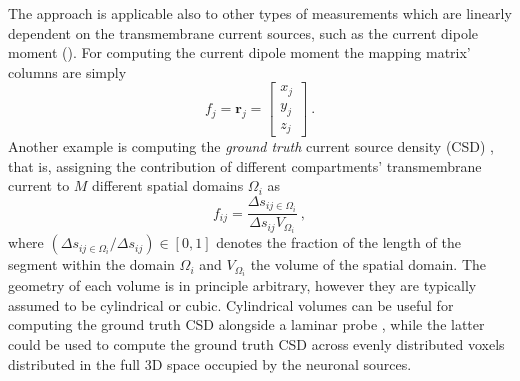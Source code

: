 The approach is applicable also to other types of measurements which are linearly dependent on the transmembrane current sources,
such as the current dipole moment ().
For computing the current dipole moment the mapping matrix' columns are simply
%
\begin{equation}
f_{j} = \mathbf{r}_j
=
\begin{bmatrix}
x_j \\
y_j \\
z_j
\end{bmatrix} ~.
\end{equation}
%
Another example is computing the \textit{ground truth} current source density (CSD) \cite{Pettersen2008,Hagen2016,Hagen2017},
that is, assigning the contribution of different compartments' transmembrane current to $M$ different spatial domains $\Omega_i$ as
%
\begin{equation}
f_{ij} = \frac{\Delta s_{ij\in \Omega_i}}{\Delta s_{ij} V_{\Omega_i}} ~,
\label{eq:LFPy:gtCSD}
\end{equation}
%
where $(\Delta s_{ij\in \Omega_i} / \Delta s_{ij}) \in [0, 1]$ denotes the fraction of the length of the segment within the domain $\Omega_i$ and
$V_{\Omega_i}$ the volume of the spatial domain.
The geometry of each volume is in principle arbitrary,
however they are typically assumed to be cylindrical or cubic.
Cylindrical volumes can be useful for computing the ground truth CSD alongside a laminar probe \cite{Pettersen2008,Hagen2016,Hagen2017},
while the latter could be used to compute the ground truth CSD across evenly distributed voxels distributed in the full 3D space occupied by the neuronal sources.


